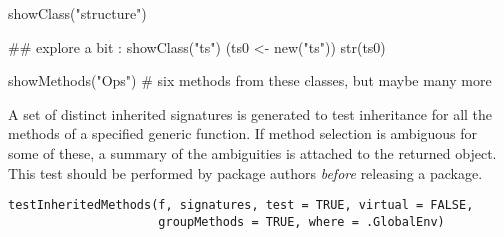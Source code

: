 %
\begin{Examples}
\begin{ExampleCode}
showClass("structure")

## explore a bit :
showClass("ts")
(ts0 <- new("ts"))
str(ts0)

showMethods("Ops") # six methods from these classes, but maybe many more
\end{ExampleCode}
\end{Examples}
%
\begin{Description}\relax
A set of distinct inherited signatures is generated to test
inheritance for all the methods of a specified generic function.  If
method selection is ambiguous for some of these, a summary of the
ambiguities is attached to the returned object.  This test should be
performed by package authors \emph{before} releasing a package.
\end{Description}
%
\begin{Usage}
\begin{verbatim}
testInheritedMethods(f, signatures, test = TRUE, virtual = FALSE,
                     groupMethods = TRUE, where = .GlobalEnv)
\end{verbatim}
\end{Usage}
%
